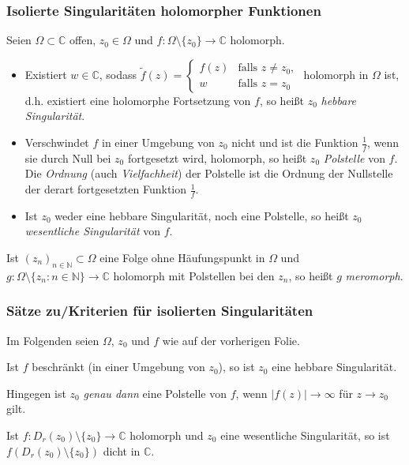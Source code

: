 \documentclass[10pt]{beamer}
\begin{document}
\begin{frame}
	\frametitle{Isolierte Singularitäten holomorpher Funktionen}
	Seien $\Omega \subset \mathbb{C}$ offen, $z_0 \in \Omega$ und $f \colon \Omega \setminus \{z_0\} \to \mathbb{C}$ holomorph.
	\pause
	\begin{itemize}
		\item Existiert $w \in \mathbb{C}$, sodass $\tilde{f}(z) = \begin{cases} f(z) & \text{falls } z \neq z_0, \\ w & \text{falls } z = z_0 \end{cases}$ holomorph in $\Omega$ ist, d.h. existiert eine holomorphe Fortsetzung von $f$, so heißt $z_0$ \emph{hebbare Singularität}.
		      \pause
		\item Verschwindet $f$ in einer Umgebung von $z_0$ nicht und ist die Funktion $\frac{1}{f}$, wenn sie durch Null bei $z_0$ fortgesetzt wird, holomorph, so heißt $z_0$ \emph{Polstelle} von $f$.
		      Die \emph{Ordnung} (auch \emph{Vielfachheit}) der Polstelle ist die Ordnung der Nullstelle der derart fortgesetzten Funktion $\frac{1}{f}$.
		      \pause
		\item Ist $z_0$ weder eine hebbare Singularität, noch eine Polstelle, so heißt $z_0$ \emph{wesentliche Singularität} von $f$.
	\end{itemize}
	\pause
	Ist $(z_n)_{n \in \mathbb{N}} \subset \Omega$ eine Folge ohne Häufungspunkt in $\Omega$ und $g \colon \Omega \setminus \{z_n : n \in \mathbb{N}\} \to \mathbb{C}$ holomorph mit Polstellen bei den $z_n$, so heißt $g$ \emph{meromorph}.
\end{frame}
\begin{frame}
	\frametitle{Sätze zu/Kriterien für isolierten Singularitäten}
	Im Folgenden seien $\Omega$, $z_0$ und $f$ wie auf der vorherigen Folie.
	\pause
	\begin{theorem}
		Ist $f$ beschränkt (in einer Umgebung von $z_0$), so ist $z_0$ eine hebbare Singularität.
	\end{theorem}
	\pause
	Hingegen ist $z_0$ \emph{genau dann} eine Polstelle von $f$, wenn $\lvert f(z) \rvert \to \infty$ für $z \to z_0$ gilt.
	\pause
	\begin{theorem}
		Ist $f \colon D_r(z_0) \setminus \{z_0\} \to \mathbb{C}$ holomorph und $z_0$ eine wesentliche Singularität, so ist $f(D_r(z_0) \setminus \{z_0\})$ dicht in $\mathbb{C}$.
	\end{theorem}
\end{frame}
\end{document}
